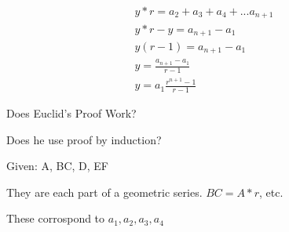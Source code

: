 \documentclass{report}
\begin{document}
\begin{description}
\begin{mdframed}
\begin{enumerate}
\begin{mdframed}
                        \begin{gather}
                            y * r = a_2 + a_3 + a_4 + ... a_{n+1}\\ 
                            y*r - y = a_{n+1} - a_1\\
                            y(r-1) = a_{n+1} - a_1\\
                            y = \frac{a_{n+1} - a_1}{r-1}\\
                            y = a_1\frac{r^{n+1} - 1}{r-1}
                        \end{gather}
                    \end{mdframed}
            \end{enumerate}
        \end{mdframed}
    \item {\large Does Euclid's Proof Work?}
        \begin{mdframed}
           Does he use proof by induction? 
        \end{mdframed}
        \begin{mdframed}
            Given: A, BC, D, EF

            They are each part of a geometric series.
            $BC = A*r$, etc.

            These corrospond to  $a_1, a_2, a_3, a_4$

        \end{mdframed}
\end{description}
\end{document}
